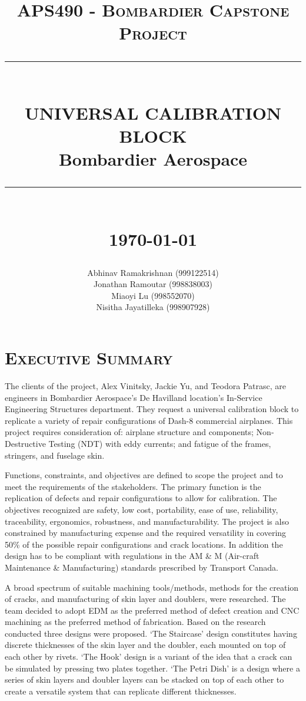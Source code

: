 \documentclass[12pt]{article}
\newcommand{\HRule}[1]{\rule{\linewidth}{#1}}
\begin{document}
\title{ \normalsize \textsc{APS490 - Bombardier Capstone Project}
		\\ [2.0cm]
		\HRule{0.5pt} \\
		\LARGE \textbf{\uppercase{Universal Calibration Block \\}}
		\LARGE Bombardier Aerospace
		\HRule{2pt} \\ [0.5cm]
		\normalsize \today \vspace*{5\baselineskip}}

\date{}

\author{
		Abhinav Ramakrishnan (999122514) \\  
		Jonathan Ramoutar (998838003) \\ 
		Miaoyi Lu (998552070) \\
		Nisitha Jayatilleka (998907928) }

\maketitle
\newpage
\section*{\textsc{Executive Summary}}

The clients of the project, Alex Vinitsky, Jackie Yu, and Teodora Patrasc, are engineers in Bombardier Aerospace's De Havilland location's In-Service Engineering Structures department. They request a universal calibration block to replicate a variety of repair configurations of Dash-8 commercial airplanes. This project requires consideration of: airplane structure and components; Non-Destructive Testing (NDT) with eddy currents; and fatigue of the frames, stringers, and fuselage skin. 

Functions, constraints, and objectives are defined to scope the project and to meet the requirements of the stakeholders. The primary function is the replication of defects and repair configurations to allow for calibration. The objectives recognized are safety, low cost, portability, ease of use, reliability, traceability, ergonomics, robustness, and manufacturability. The project is also constrained by manufacturing expense and the required versatility in covering 50\% of the possible repair configurations and crack locations. In addition the design has to be compliant with regulations in the AM \& M (Air-craft Maintenance \& Manufacturing) standards prescribed by Transport Canada.

A broad spectrum of suitable machining tools/methods, methods for the creation of cracks, and manufacturing of skin layer and doublers, were researched. The team decided to adopt EDM as the preferred method of defect creation and CNC machining as the preferred method of fabrication. Based on the research conducted three designs were proposed. `The Staircase' design constitutes having discrete thicknesses of the skin layer and the doubler, each mounted on top of each other by rivets. `The Hook' design is a variant of the idea that a crack can be simulated by pressing two plates together. `The Petri Dish' is a design where a series of skin layers and doubler layers can be stacked on top of each other to create a versatile system that can replicate different thicknesses.
\end{document}
